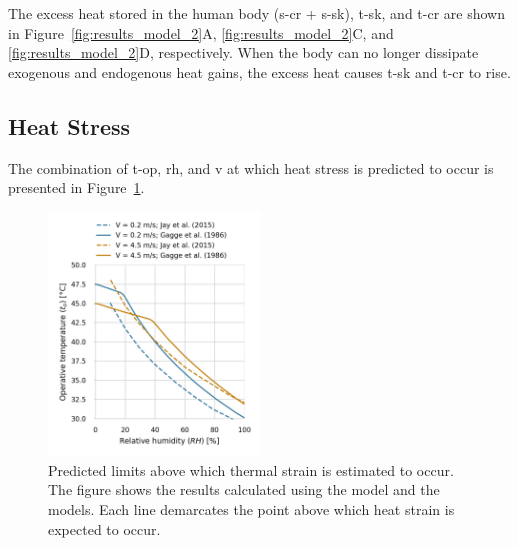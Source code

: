 
The excess heat stored in the human body (\acs{s-cr} + \acs{s-sk}), \ac{t-sk}, and \ac{t-cr} are shown in Figure~\ref{fig:results_model_2}A, \ref{fig:results_model_2}C, and \ref{fig:results_model_2}D, respectively.
When the body can no longer dissipate exogenous and endogenous heat gains, the excess heat causes \ac{t-sk} and \ac{t-cr} to rise.

\subsection{Heat Stress}\label{subsec:heat-stress}

The combination of \ac{t-op}, \ac{rh}, and \ac{v} at which heat stress is predicted to occur is presented in Figure~\ref{fig:comparison_air_speed}.

\begin{figure}[hbt!]
    \centering
    \includegraphics[width=0.5\textwidth]{figures/comparison_air_speed}
    \caption{Predicted limits above which thermal strain is estimated to occur.
    The figure shows the results calculated using the  model and the  models.
    Each line demarcates the point above which heat strain is expected to occur.}
    \label{fig:comparison_air_speed}
\end{figure}

